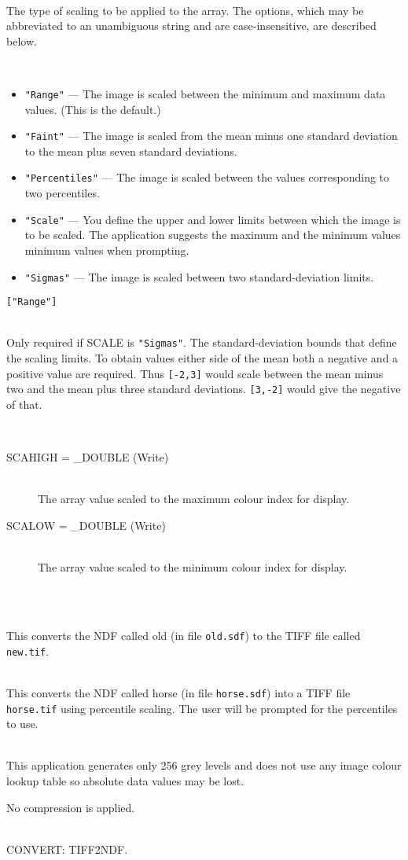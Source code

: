 \documentclass[twoside,11pt]{article}
\newcommand{\htmlref}[2]{#1}
\newcommand{\latex}[1]{#1}
\newcommand{\xref}[3]{#1}
\newcommand{\CONVERT}{{\footnotesize CONVERT}}
\newlength{\sstexampleslength}
\newcommand{\sstresparameters}[1]{
   \goodbreak 
   \item[Results Parameters:] \mbox{} \\
   \vspace{-3.5ex}
   \begin{description}
      #1
   \end{description}
}
\newcommand{\sstexamples}[1]{
   \goodbreak
   \item[Examples:] \mbox{} \\
   \vspace{-3.5ex}
   \begin{description}
      #1
   \end{description}
}
\newcommand{\sstsubsection}[1]{ \item[{#1}] \mbox{} \\}
\newcommand{\sstexamplesubsection}[2]{\sloppy
\item[\parbox{\sstexampleslength}{\ssttt #1}] \mbox{} \vspace{0.5ex}
\\ #2 \vspace{1.0ex}}
\newcommand{\sstnotes}[1]{\pagebreak[3] \item[Notes:] \mbox{} \\[1.3ex] #1}
\newcommand{\sstdiytopic}[2]{\goodbreak \item[{\hspace{-0.35em}#1\hspace{-0.35em}:}] \mbox{} \\[1.3ex] #2}
\newcommand{\ssthitemlist}[1]{
  \latex{
  \mbox{} \\
  \vspace{-3.5ex}
  }
  \begin{itemize}
     #1
  \end{itemize}
}
\newcommand{\sstitem}{\item}
\newcommand{\sstresparameters}[1]{
      \item[\\ \xref{Results Parameters:}{sun95}{se_parout}] \\
      \begin{description}
         #1
      \end{description}
   }
\newcommand{\sstexamples}[1]{
   \item[\vspace{0.35ex}\htmlref{Examples:\vspace{-0.5ex}}{app_example}]
      \begin{description}
         #1
      \end{description}
      \\
   }
\newcommand{\sstsubsection}[1]{\item[{#1}]}
\newcommand{\sstexamplesubsection}[2]{
   \vspace{-1.0ex} \item[{\ssttt #1}] #2 \vspace{0.2ex}}
\newcommand{\sstnotes}[1]{\item[Notes:]
      \begin{description}
         #1
      \end{description}
   }
\newcommand{\sstdiytopic}[2]{\\ \item[{#1}:]
      \begin{description}
         #2
      \end{description}
   }
\newcommand{\sstitem}{\item}
\begin{document}
{{{      }
      \sstsubsection{
         SCALE =  \xref{LITERAL}{sun95}{se_parmenu} (Read)
      }{
        The type of scaling to be applied to the array.
        The options, which may be abbreviated to an unambiguous string
        and are case-insensitive, are described below.
        \ssthitemlist{
           \sstitem
           {\texttt{"Range"}}  --- The image is scaled between the minimum and
                          maximum data values.  (This is the default.)
           \sstitem
           {\texttt{"Faint"}}  --- The image is scaled from the mean minus one
                          standard deviation to the mean plus seven
                          standard deviations.  
           \sstitem
           {\texttt{"Percentiles"}} --- The image is scaled between the values
                          corresponding to two percentiles.  
           \sstitem
           {\texttt{"Scale"}} --- You define the upper and lower limits
                          between which the image is to be scaled.  The
                          application suggests the maximum and the
                          minimum values minimum values when prompting.
           \sstitem
           {\texttt{"Sigmas"}} --- The image is scaled between two
                          standard-deviation limits.  
         }
         \texttt{["Range"]}
      }
      \sstsubsection{
        SIGMAS( 2 ) = \_REAL (Read)
      }{
        Only required if SCALE is {\texttt{"Sigmas"}}.
        The standard-deviation bounds that define the scaling limits.
        To obtain values either side of the mean both a negative and
        a positive value are required.  Thus {\texttt{[-2,3]}} would scale
        between the mean minus two and the mean plus three standard
        deviations.  {\texttt{[3,-2]}} would give the negative of that.
      }
   }
   \sstresparameters{
      \sstsubsection{
        SCAHIGH = \_DOUBLE (Write)
      }{
        The array value scaled to the maximum colour index for display.
      }
      \sstsubsection{
        SCALOW = \_DOUBLE (Write)
      }{
        The array value scaled to the minimum colour index for display.
      }
   }
   \sstexamples{
      \sstexamplesubsection{
         ndf2tiff old new
      }{
         This converts the NDF called old (in file \texttt{old.sdf}) to the
         TIFF file called \texttt{new.tif}.
      }
      \sstexamplesubsection{
         ndf2tiff horse horse pe
      }{
        This converts the NDF called horse (in file \texttt{horse.sdf})
        into a TIFF file \texttt{horse.tif} using percentile scaling.
        The user will be prompted for the percentiles to use.
      }
   }
   \sstnotes{
      This application generates only 256 grey levels and does not use 
      any image colour lookup table so absolute data values may be lost.

      No compression is applied.
   }
   \sstdiytopic{
      Related Applications
   }{
      \CONVERT: \htmlref{TIFF2NDF}{TIFF2NDF}.
   }
}
\end{document}
